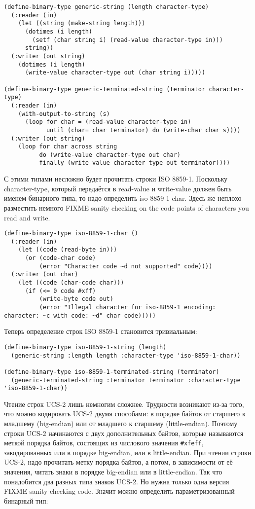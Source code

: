 \begin{lstlisting}
(define-binary-type generic-string (length character-type)
  (:reader (in)
    (let ((string (make-string length)))
      (dotimes (i length)
        (setf (char string i) (read-value character-type in)))
      string))
  (:writer (out string)
    (dotimes (i length)
      (write-value character-type out (char string i)))))

(define-binary-type generic-terminated-string (terminator character-type)
  (:reader (in)
    (with-output-to-string (s)
      (loop for char = (read-value character-type in)
            until (char= char terminator) do (write-char char s))))
  (:writer (out string)
    (loop for char across string
          do (write-value character-type out char)
          finally (write-value character-type out terminator))))
\end{lstlisting}

С этими типами несложно будет прочитать строки ISO 8859-1.  Поскольку character-type,
который передаётся в read-value и write-value должен быть именем бинарного типа, то надо
определить iso-8859-1-char.  Здесь же неплохо разместить немного FIXME sanity checking on
the code points of characters you read and write.

\begin{lstlisting}
(define-binary-type iso-8859-1-char ()
  (:reader (in)
    (let ((code (read-byte in)))
      (or (code-char code)
          (error "Character code ~d not supported" code))))
  (:writer (out char)
    (let ((code (char-code char)))
      (if (<= 0 code #xff)
          (write-byte code out)
          (error "Illegal character for iso-8859-1 encoding: character: ~c with code: ~d" char code)))))
\end{lstlisting}

Теперь определение строк ISO 8859-1 становится тривиальным:

\begin{lstlisting}
(define-binary-type iso-8859-1-string (length)
  (generic-string :length length :character-type 'iso-8859-1-char))

(define-binary-type iso-8859-1-terminated-string (terminator)
  (generic-terminated-string :terminator terminator :character-type 'iso-8859-1-char))
\end{lstlisting}

Чтение строк UCS-2 лишь немногим сложнее.  Трудности возникают из-за того, что можно
кодировать UCS-2 двумя способами: в порядке байтов от старшего к младшему (big-endian) или
от младшего к старшему (little-endian).  Поэтому строки UCS-2 начинаются с двух
дополнительных байтов, которые называются меткой порядка байтов, состоящих из числового
значения \lstinline!#xfeff!, закодированных или в порядке big-endian, или в little-endian.
При чтении строки UCS-2, надо прочитать метку порядка байтов, а потом, в зависимости от её
значения, читать знаки в порядке big-endian или в little-endian.  Так что понадобится два
разных типа знаков UCS-2.  Но нужна только одна версия FIXME sanity-checking code.  Значит
можно определить параметризованный бинарный тип:

